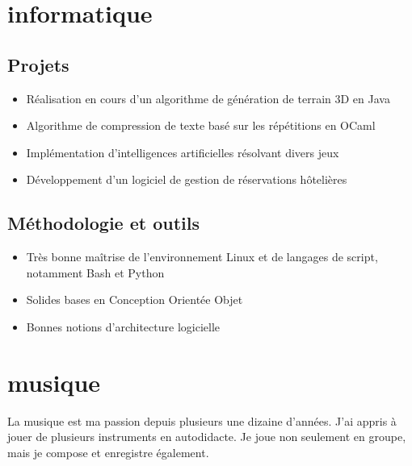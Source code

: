 \section{informatique}
\subsection{Projets}
    \begin{itemize}
        \item Réalisation en cours d'un algorithme de génération de terrain 3D
            en Java
        \item Algorithme de compression de texte basé sur les répétitions en
            OCaml
        \item Implémentation d'intelligences artificielles résolvant divers jeux
        \item Développement d'un logiciel de gestion de réservations hôtelières
    \end{itemize}
\subsection{Méthodologie et outils}
    \begin{itemize}
        \item Très bonne maîtrise de l'environnement Linux et de langages de
            script, notamment Bash et Python
        \item Solides bases en Conception Orientée Objet
        \item Bonnes notions d'architecture logicielle
    \end{itemize}



\section{musique}
\vspace{-0.2cm}
La musique est ma passion depuis plusieurs une dizaine d'années.
J'ai appris à jouer de plusieurs instruments en autodidacte. Je joue non
seulement en groupe, mais je compose et enregistre également.
